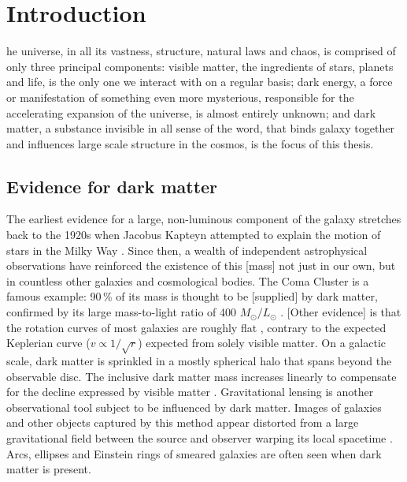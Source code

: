 %
%
\let\textcircled=\pgftextcircled
\chapter{Introduction}
\label{chap:intro}


he universe, in all its vastness, structure, natural laws and chaos, is comprised of only three principal components: visible matter, the ingredients of stars, planets and life, is the only one we interact with on a regular basis; dark energy, a force or manifestation of something even more mysterious, responsible for the accelerating expansion of the universe, is almost entirely unknown; and dark matter, a substance invisible in all sense of the word, that binds galaxy together and influences large scale structure in the cosmos, is the focus of this thesis.


\section{Evidence for dark matter}
\label{sec:intro_dm_evidence}

The earliest evidence for a large, non-luminous component of the galaxy stretches back to the 1920s when Jacobus Kapteyn attempted to explain the motion of stars in the Milky Way \cite{1922ApJ....55..302K}. Since then, a wealth of independent astrophysical observations have reinforced the existence of this [mass] not just in our own, but in countless other galaxies and cosmological bodies. The Coma Cluster is a famous example: 90\,\% of its mass is thought to be [supplied] by dark matter, confirmed by its large mass-to-light ratio of 400 $M_{\odot} / L_{\odot}$ \cite{Yozin:2015mla}. [Other evidence] is that the rotation curves of most galaxies are roughly flat \cite{1996MNRAS-281-27P}, contrary to the expected Keplerian curve ($v \propto 1/\sqrt{r}$) expected from solely visible matter. On a galactic scale, dark matter is sprinkled in a mostly spherical halo that spans beyond the observable disc. The inclusive dark matter mass increases linearly \cite{2009arXiv0901.0632E} to compensate for the decline expressed by visible matter \cite{1970ApJ-160-811F,1992AandA-256-19B}. Gravitational lensing is another observational tool subject to be influenced by dark matter. Images of galaxies and other objects captured by this method appear distorted from a large gravitational field between the source and observer warping its local spacetime \cite{2010GReGr..42.2177H}. Arcs, ellipses and Einstein rings of smeared galaxies are often seen when dark matter is present.

